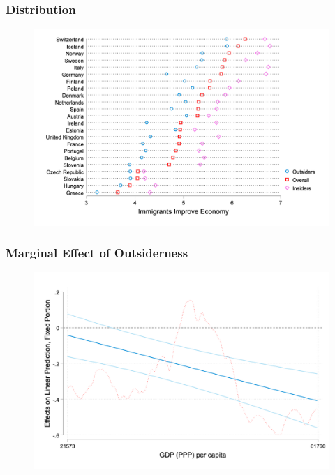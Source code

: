 \documentclass[14pt]{beamer}
\begin{document}
\begin{frame}
	\frametitle{Distribution}
	\begin{figure}
		\includegraphics[width=\textwidth]{Figure_1}
	\end{figure}
\end{frame}

\begin{frame}
	\frametitle{Marginal Effect of Outsiderness}
	\begin{figure}
		\includegraphics[width=\textwidth]{Figure_2}
	\end{figure}
\end{frame}
\end{document}
